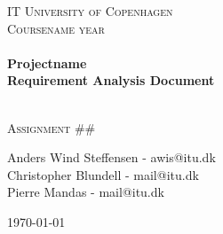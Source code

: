 


%


\begin{center}
\thispagestyle{empty}


\textsc{\LARGE IT University of Copenhagen}\\[1.5cm]

\textsc{\Large Coursename year }\\[0.5cm]

\HRule \\[0.4cm]
{ \huge \bfseries Projectname \\ Requirement Analysis Document\\ [0.4cm]
    }

\HRule \\[1cm]

\textsc{\Large Assignment ## }\\[1.5cm]

\begin{minipage}{1\textwidth}
\begin{center} \large
Anders Wind Steffensen - awis@itu.dk\\
Christopher Blundell - mail@itu.dk\\
Pierre Mandas - mail@itu.dk\\
\end{center}
\end{minipage}


\vfill

{\large \today}

\end{center}

\frontmatter%

%
%


\tableofcontents
\newpage

\mainmatter%









